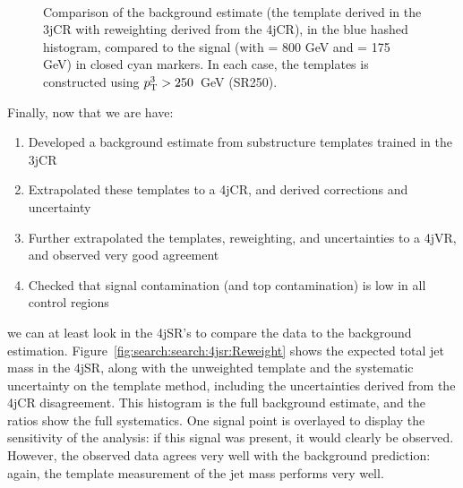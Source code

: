 \begin{figure}[!ht]
  \centering
  
  \\
    
  \caption{Comparison of the background estimate (the template derived in the 3jCR with reweighting derived from the 4jCR), in the blue hashed histogram, compared to the signal (with \mgluino = 800 GeV and \mchi = 175 GeV) in closed cyan markers. In each case, the \MJ templates is constructed using $p_{\text{T}}^{3}>250$~GeV (SR250).}
               
  \label{fig:search:search:4jsr:overlaySR250}
\end{figure}








Finally, now that we are have:
%
\begin{enumerate}
\item Developed a background estimate from substructure templates trained in the 3jCR
\item Extrapolated these templates to a 4jCR, and derived corrections and uncertainty
\item Further extrapolated the templates, reweighting, and uncertainties to a 4jVR, and observed very good agreement
\item Checked that signal contamination (and top contamination) is low in all control regions
\end{enumerate}
%
we can at least look in the 4jSR's to compare the data to the background estimation. Figure~\ref{fig:search:search:4jsr:Reweight} shows the expected total jet mass in the 4jSR, along with the unweighted template and the systematic uncertainty on the template method, including the uncertainties derived from the 4jCR disagreement. This histogram is the full background estimate, and the ratios show the full systematics. One signal point is overlayed to display the sensitivity of the analysis: if this signal was present, it would clearly be observed. However, the observed data agrees very well with the background prediction: again, the template measurement of the jet mass performs very well.



